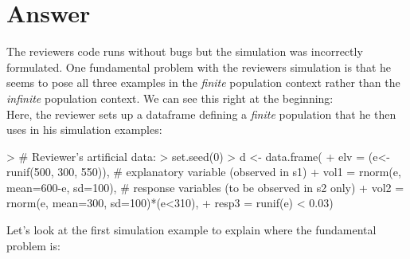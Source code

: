 \documentclass{article}
\begin{document}

\section*{Answer}

The reviewers code runs without bugs but the simulation was incorrectly formulated. One fundamental problem with the reviewers simulation is that he seems to pose all three examples in the \textit{finite} population context rather than the \textit{infinite} population context. We can see this right at the beginning:\\

Here, the reviewer sets up a dataframe defining a \textit{finite} population that he then uses in his simulation examples:

\begin{small}
\begin{Schunk}
\begin{Sinput}
> # Reviewer's artificial data:
> set.seed(0)
> d <- data.frame(
+           elv = (e<-runif(500, 300, 550)),     # explanatory variable (observed in s1)
+           vol1 = rnorm(e, mean=600-e, sd=100), # response variables (to be observed in s2 only)
+           vol2 = rnorm(e, mean=300, sd=100)*(e<310),
+           resp3 = runif(e) < 0.03)
\end{Sinput}
\end{Schunk}
\end{small}

Let's look at the first simulation example to explain where the fundamental problem is:

\begin{small}
\begin{Schunk}
\end{Schunk}
\end{small}
\end{document}
